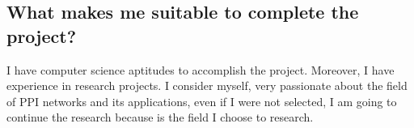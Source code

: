 \documentclass[a4paper]{article}
\begin{document}
\subsection{What makes me suitable to complete the project?}
I have computer science aptitudes to accomplish the project. Moreover, I have experience in research projects. I consider myself, very passionate about the field of PPI networks and its applications, even if I were not selected, I am going to continue the research because is the field I choose to research.




\end{document}
